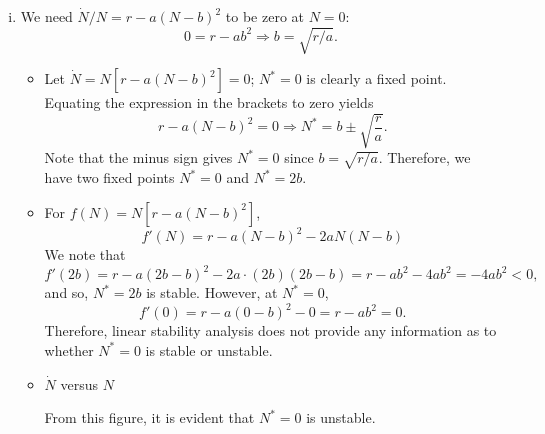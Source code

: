 \documentclass[12pt]{article}
\begin{document}
\begin{ex}
\begin{solution}
\begin{enumerate}[(i)]
\begin{itemize}
    \end{itemize}

  \item We need $\dot{N}/N=r-a(N-b)^2$ to be zero at $N=0$:
    $$0=r-ab^2\Rightarrow b=\sqrt{r/a}.$$

    \begin{itemize}\setlength{\itemsep}{0pt}
    \item Let $\dot{N}=N\left[r-a(N-b)^2\right]=0$; $N^*=0$ is clearly a fixed point. Equating the expression in the brackets to zero yields
      $$r-a(N-b)^2=0\Rightarrow N^*=b\pm\sqrt{\frac{r}{a}}.$$
      Note that the minus sign gives $N^*=0$ since $b=\sqrt{r/a}$. Therefore, we have two fixed points $N^*=0$ and $N^*=2b$.
    \item For $f(N)=N\left[r-a(N-b)^2\right]$,
      $$f'(N)=r-a(N-b)^2-2aN(N-b)$$
      We note that
      $$f'(2b)=r-a(2b-b)^2-2a\cdot(2b)(2b-b)=r-ab^2-4ab^2=-4ab^2<0,$$
      and so, $N^*=2b$ is stable. However, at $N^*=0$,
      $$f'(0)=r-a(0-b)^2-0=r-ab^2=0.$$
      Therefore, linear stability analysis does not provide any information as to whether $N^*=0$ is stable or unstable.
      
    \item $\dot{N}$ versus $N$

    \begin{center}
    \end{center}

    From this figure, it is evident that $N^*=0$ is unstable.
    

\end{itemize}
\end{enumerate}
\end{solution}
\end{ex}
\end{document}
